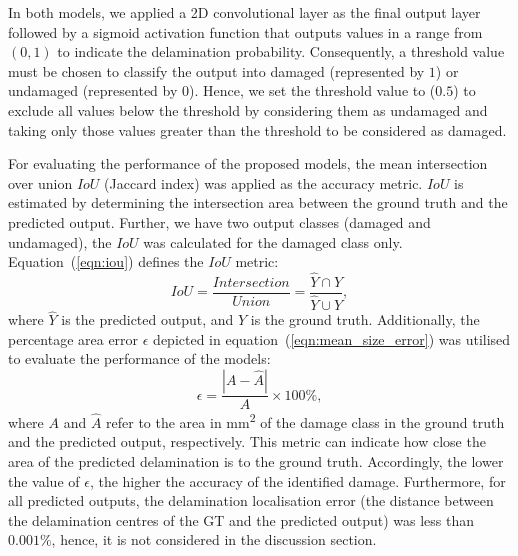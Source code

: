 In both models, we applied a 2D convolutional layer as the final output layer followed by a sigmoid activation function that outputs values in a range from \((0,1)\) to indicate the delamination probability.
Consequently, a threshold value must be chosen to classify the output into damaged (represented by \(1\)) or undamaged (represented by \(0\)).
Hence, we set the threshold value to (\(0.5\)) to exclude all values below the threshold by considering them as undamaged and taking only those values greater than the threshold to be considered as damaged.

For evaluating the performance of the proposed models, the mean 
intersection over union \(IoU\) (Jaccard index) was applied as the accuracy metric. 
\(IoU\) is estimated by determining the intersection
area between the ground truth and the predicted output. 
Further, we have two output classes (damaged and undamaged), the \(IoU\) was calculated for the damaged class only. 
Equation~(\ref{eqn:iou}) defines the \(IoU\) metric: 
\begin{equation}
	IoU=\frac{Intersection}{Union}=\frac{\hat{Y} \cap Y}{\hat{Y} \cup Y},
	\label{eqn:iou}
\end{equation}
where \(\hat{Y}\) is the predicted output, and \(Y\) is the ground truth.
Additionally, the percentage area error $\epsilon$ depicted in 
equation~(\ref{eqn:mean_size_error}) was utilised to evaluate the performance 
of the models:
\begin{equation}
	\epsilon=\frac{|A-\hat{A}|}{A} \times 100\%,
	\label{eqn:mean_size_error}
\end{equation}
where \(A\) and \(\hat{A}\) refer to the area in mm\textsuperscript{2} of the damage class in the ground truth and the predicted output, respectively.
This metric can indicate how close the area of the predicted delamination is to the ground truth.
Accordingly, the lower the value of $\epsilon$, the higher the accuracy of the identified damage. 
Furthermore, for all predicted outputs, the delamination localisation error (the distance between the delamination centres of the GT and the predicted output) was less than \(0.001\%\), hence, it is not considered in the discussion section.